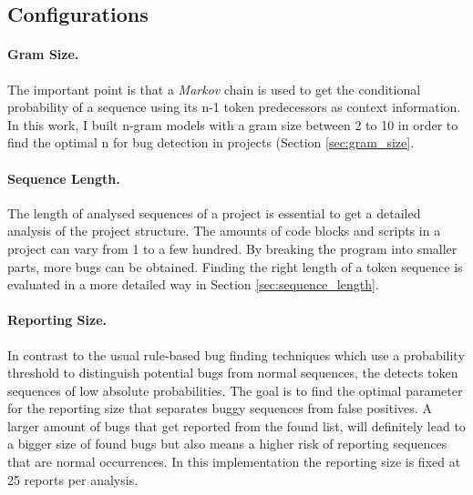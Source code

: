 \subsection{Configurations}\label{subsec:configurations}

\paragraph{Gram Size.}
The important point is that a \textit{Markov} chain is used to get the conditional probability of a sequence using its n-1 token predecessors as context information. In this work, I built n-gram models with a gram size between 2 to 10 in order to find the optimal n for bug detection in \scratch{} projects (Section \ref{sec:gram_size}. 
\paragraph{Sequence Length.}
The length of analysed sequences of a project is essential to get a detailed analysis of the project structure. The amounts of code blocks and scripts in a \scratch{} project can vary from 1 to a few hundred. By breaking the program into smaller parts, more bugs can be obtained. Finding the right length of a token sequence is evaluated in a more detailed way in Section \ref{sec:sequence_length}.
\paragraph{Reporting Size.}
In contrast to the usual rule-based bug finding techniques which use a probability threshold to distinguish potential bugs from normal sequences, the \ngram{} detects token sequences of low absolute probabilities. The goal is to find the optimal parameter for the reporting size that separates buggy sequences from false positives. A larger amount of bugs that get reported from the found list, will definitely lead to a bigger size of found bugs but also means a higher risk of reporting sequences that are normal occurrences. In this implementation the reporting size is fixed at 25 reports per analysis.
